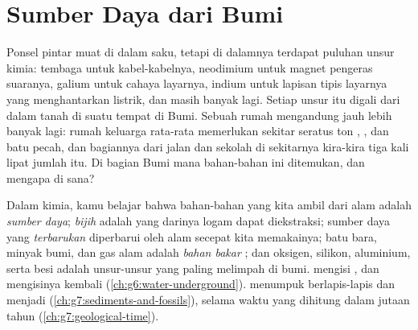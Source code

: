 \chapter{Sumber Daya dari Bumi}\label{ch:g9:earth-resources}

Ponsel pintar muat di dalam saku, tetapi di dalamnya terdapat puluhan
unsur kimia: tembaga untuk kabel-kabelnya, neodimium untuk magnet
pengeras suaranya, galium untuk cahaya layarnya, indium untuk lapisan
tipis layarnya yang menghantarkan listrik, dan masih banyak lagi. Setiap
unsur itu digali dari dalam tanah di suatu tempat di Bumi. Sebuah rumah
mengandung jauh lebih banyak lagi: rumah keluarga rata-rata memerlukan
sekitar seratus ton , , dan batu pecah, dan bagiannya dari
jalan dan sekolah di sekitarnya kira-kira tiga kali lipat jumlah itu. Di
bagian Bumi mana bahan-bahan ini ditemukan, dan mengapa di sana?

\begin{recall}
Dalam kimia, kamu belajar bahwa bahan-bahan yang kita ambil dari alam
adalah \emph{sumber daya}; \emph{bijih} adalah  yang darinya logam
dapat diekstraksi; sumber daya yang \emph{terbarukan} diperbarui oleh alam
secepat kita memakainya; batu bara, minyak bumi, dan gas alam adalah
\emph{bahan bakar }; dan oksigen, silikon, aluminium, serta besi
adalah unsur-unsur yang paling melimpah di  bumi.  mengisi
 , dan  mengisinya kembali
(\cref{ch:g6:water-underground}).  menumpuk berlapis-lapis dan
menjadi  (\cref{ch:g7:sediments-and-fossils}), selama waktu
yang dihitung dalam jutaan tahun (\cref{ch:g7:geological-time}).
\end{recall}

